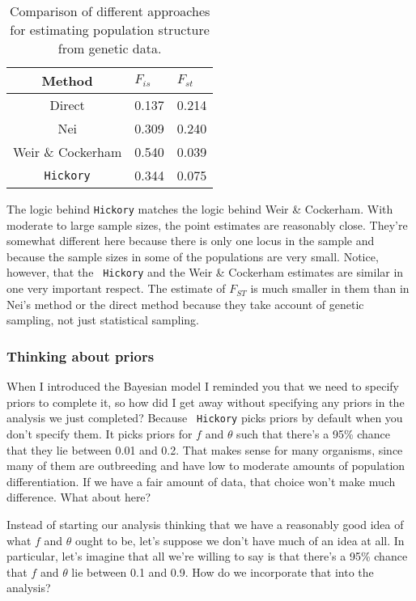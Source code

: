 \begin{table}
\begin{center}
  \begin{tabular}{c|ll}
\hline\hline
Method & $F_{is}$ & $F_{st}$ \\
\hline
Direct            & 0.137 & 0.214 \\
Nei               & 0.309 & 0.240 \\
Weir \& Cockerham & 0.540 & 0.039 \\
{\tt Hickory}     & 0.344 & 0.075 \\
\hline
\end{tabular}
\end{center}
\caption{Comparison of different approaches for estimating population
  structure from genetic data.}\label{table:hickory-comparison}
\end{table}

The logic behind {\tt Hickory\/} matches the logic behind Weir \&
Cockerham. With moderate to large sample sizes, the point estimates
are reasonably close. They're somewhat different here because there is
only one locus in the sample and because the sample sizes in some of
the populations are very small. Notice, however, that the {\tt
  Hickory} and the Weir \& Cockerham estimates are similar in one very
important respect. The estimate of $F_{ST}$ is much smaller in them
than in Nei's method or the direct method because they take account of
genetic sampling, not just statistical sampling.

\subsubsection*{Thinking about priors}

When I introduced the Bayesian model I reminded you that we need to
specify priors to complete it, so how did I get away without
specifying any priors in the analysis we just completed? Because {\tt
  Hickory} picks priors by default when you don't specify them. It
picks priors for $f$ and $\theta$ such that there's a 95\% chance that
they lie between 0.01 and 0.2. That makes sense for many organisms,
since many of them are outbreeding and have low to moderate amounts of
population differentiation. If we have a fair amount of data, that
choice won't make much difference. What about here?

Instead of starting our analysis thinking that we have a reasonably
good idea of what $f$ and $\theta$ ought to be, let's suppose we don't
have much of an idea at all. In particular, let's imagine that all
we're willing to say is that there's a 95\% chance that $f$ and
$\theta$ lie between 0.1 and 0.9. How do we incorporate that into the
analysis?

